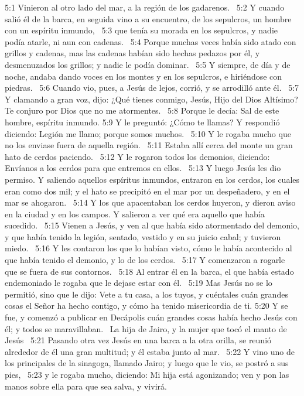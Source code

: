 5:1 Vinieron al otro lado del mar, a la región de los gadarenos.  
5:2 Y cuando salió él de la barca, en seguida vino a su encuentro, de los sepulcros, un hombre con un espíritu inmundo,  
5:3 que tenía su morada en los sepulcros, y nadie podía atarle, ni aun con cadenas.  
5:4 Porque muchas veces había sido atado con grillos y cadenas, mas las cadenas habían sido hechas pedazos por él, y desmenuzados los grillos; y nadie le podía dominar.  
5:5 Y siempre, de día y de noche, andaba dando voces en los montes y en los sepulcros, e hiriéndose con piedras.  
5:6 Cuando vio, pues, a Jesús de lejos, corrió, y se arrodilló ante él.  
5:7 Y clamando a gran voz, dijo: ¿Qué tienes conmigo, Jesús, Hijo del Dios Altísimo? Te conjuro por Dios que no me atormentes.  
5:8 Porque le decía: Sal de este hombre, espíritu inmundo. 
5:9 Y le preguntó: ¿Cómo te llamas? Y respondió diciendo: Legión me llamo; porque somos muchos.  
5:10 Y le rogaba mucho que no los enviase fuera de aquella región.  
5:11 Estaba allí cerca del monte un gran hato de cerdos paciendo.  
5:12 Y le rogaron todos los demonios, diciendo: Envíanos a los cerdos para que entremos en ellos.  
5:13 Y luego Jesús les dio permiso. Y saliendo aquellos espíritus inmundos, entraron en los cerdos, los cuales eran como dos mil; y el hato se precipitó en el mar por un despeñadero, y en el mar se ahogaron.  
5:14 Y los que apacentaban los cerdos huyeron, y dieron aviso en la ciudad y en los campos. Y salieron a ver qué era aquello que había sucedido.  
5:15 Vienen a Jesús, y ven al que había sido atormentado del demonio, y que había tenido la legión, sentado, vestido y en su juicio cabal; y tuvieron miedo.  
5:16 Y les contaron los que lo habían visto, cómo le había acontecido al que había tenido el demonio, y lo de los cerdos.  
5:17 Y comenzaron a rogarle que se fuera de sus contornos.  
5:18 Al entrar él en la barca, el que había estado endemoniado le rogaba que le dejase estar con él.  
5:19 Mas Jesús no se lo permitió, sino que le dijo: Vete a tu casa, a los tuyos, y cuéntales cuán grandes cosas el Señor ha hecho contigo, y cómo ha tenido misericordia de ti. 
5:20 Y se fue, y comenzó a publicar en Decápolis cuán grandes cosas había hecho Jesús con él; y todos se maravillaban.  
La hija de Jairo, y la mujer que tocó el manto de Jesús   
5:21 Pasando otra vez Jesús en una barca a la otra orilla, se reunió alrededor de él una gran multitud; y él estaba junto al mar.  
5:22 Y vino uno de los principales de la sinagoga, llamado Jairo; y luego que le vio, se postró a sus pies,  
5:23 y le rogaba mucho, diciendo: Mi hija está agonizando; ven y pon las manos sobre ella para que sea salva, y vivirá.  
